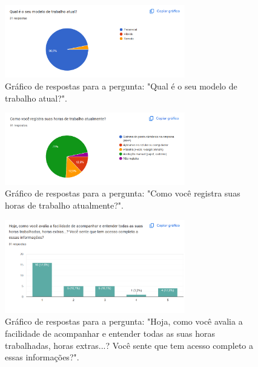 \begin{apendicesenv}
\begin{figure}[h!]
  \centering
  \includegraphics[width=0.7\textwidth]{imagens/modelo-trabalho.png}
  \caption{Gráfico de respostas para a pergunta: "Qual é o seu modelo de trabalho atual?".}
  \label{fig:resp-func-modelo-trabalho}
\end{figure}

\begin{figure}[h!]
  \centering
  \includegraphics[width=0.7\textwidth]{imagens/como-registra-ponto.png}
  \caption{Gráfico de respostas para a pergunta: "Como você registra suas horas de trabalho atualmente?".}
  \label{fig:resp-func-registro-ponto}
\end{figure}

\begin{figure}[h!]
  \centering
  \includegraphics[width=0.7\textwidth]{imagens/como-acompanha.png}
  \caption{Gráfico de respostas para a pergunta: "Hoja, como você avalia a facilidade de acompanhar e entender todas as suas horas trabalhadas, horas extras...? Você sente que tem acesso completo a essas informações?".}
  \label{fig:resp-func-acesso-informacoes}
\end{figure}


\end{apendicesenv}
